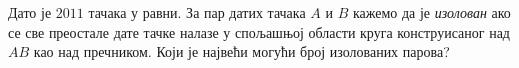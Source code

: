 \problem
Дато је $2011$ тачака у равни. За пар датих тачака $A$ и $B$ кажемо да је
\emph{изолован} ако се све преостале дате тачке налазе у спољашњој области
круга конструисаног над $AB$ као над пречником.
Који је највећи могући број изолованих парова?

\solution

\endproblem
